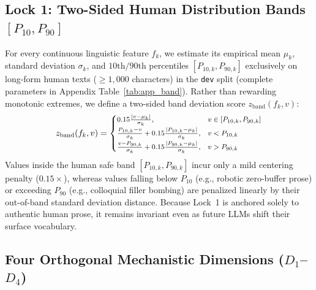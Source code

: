\documentclass[11pt]{article}
\begin{document}
\subsection{Lock 1: Two-Sided Human Distribution Bands $[P_{10}, P_{90}]$}
For every continuous linguistic feature $f_k$, we estimate its empirical mean $\mu_k$, standard deviation $\sigma_k$, and $10\text{th}/90\text{th}$ percentiles $[P_{10,k}, P_{90,k}]$ exclusively on long-form human texts ($\ge 1,000$ characters) in the \texttt{dev} split (complete parameters in Appendix Table~\ref{tab:app_band}). Rather than rewarding monotonic extremes, we define a two-sided band deviation score $z_{\text{band}}(f_k, v)$:
\begin{equation}
\footnotesize
z_{\text{band}}(f_k, v) = 
\begin{cases} 
0.15 \frac{|v - \mu_k|}{\sigma_k}, & v \in [P_{10,k}, P_{90,k}] \\[3pt]
\frac{P_{10,k} - v}{\sigma_k} + 0.15 \frac{|P_{10,k} - \mu_k|}{\sigma_k}, & v < P_{10,k} \\[3pt]
\frac{v - P_{90,k}}{\sigma_k} + 0.15 \frac{|P_{90,k} - \mu_k|}{\sigma_k}, & v > P_{90,k}
\end{cases}
\label{eq:twosided}
\end{equation}
Values inside the human safe band $[P_{10,k}, P_{90,k}]$ incur only a mild centering penalty ($0.15\times$), whereas values falling below $P_{10}$ (e.g., robotic zero-buffer prose) or exceeding $P_{90}$ (e.g., colloquial filler bombing) are penalized linearly by their out-of-band standard deviation distance. Because Lock~1 is anchored solely to authentic human prose, it remains invariant even as future LLMs shift their surface vocabulary.

\subsection{Four Orthogonal Mechanistic Dimensions ($D_1$--$D_4$)}
\end{document}
